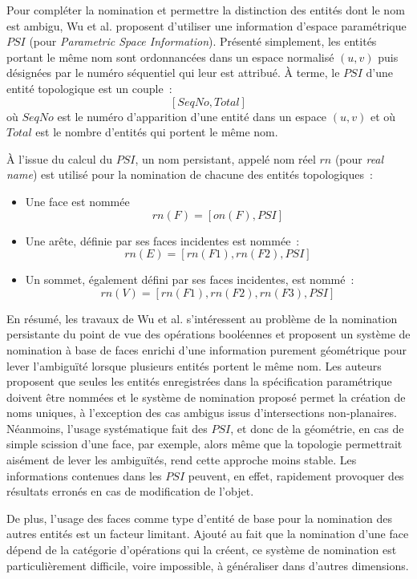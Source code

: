 Pour compléter la nomination et permettre la distinction des entités dont le
nom est ambigu, Wu et al. proposent d'utiliser une information d'espace
paramétrique \(PSI\) (pour \emph{Parametric Space Information}). %
Présenté simplement, les entités portant le même nom sont ordonnancées dans un
espace normalisé \((u,v)\) puis désignées par le numéro séquentiel qui leur est
attribué. %
À terme, le \(PSI\) d'une entité topologique est un couple~:
\[[SeqNo, Total]\] %
où \(SeqNo\) est le numéro d'apparition d'une entité dans un espace \((u,v)\) et
où \(Total\) est le nombre d'entités qui portent le même nom. %

À l'issue du calcul du \(PSI\), un nom persistant, appelé nom réel \(rn\) (pour
\emph{real name}) est utilisé pour la nomination de chacune des entités
topologiques~:
\begin{itemize}
	\item Une face est nommée %
	      \[rn(F) = [on(F), PSI]\]
	\item Une arête, définie par ses faces incidentes est nommée~:
	      \[rn(E) = [rn(F1), rn(F2), PSI]\]
	\item Un sommet, également défini par ses faces incidentes, est nommé~:
	      \[rn(V) = [rn(F1), rn(F2),rn(F3), PSI]\]
\end{itemize}

En résumé, les travaux de Wu et al. s'intéressent au problème de la nomination
persistante du point de vue des opérations booléennes et proposent un système de
nomination à base de faces enrichi d'une information purement géométrique pour
lever l'ambiguïté lorsque plusieurs entités portent le même nom. %
Les auteurs proposent que seules les entités enregistrées dans la spécification
paramétrique doivent être nommées et le système de nomination proposé permet la
création de noms uniques, à l'exception des cas ambigus issus d'intersections
non-planaires. %
Néanmoins, l'usage systématique fait des \(PSI\), et donc de la géométrie, en
cas de simple scission d'une face, par exemple, alors même que la topologie
permettrait aisément de lever les ambiguïtés, rend cette approche moins stable. %
Les informations contenues dans les \(PSI\) peuvent, en effet, rapidement
provoquer des résultats erronés en cas de modification de l'objet.

De plus, l'usage des faces comme type d'entité de base pour la nomination des
autres entités est un facteur limitant. %
Ajouté au fait que la nomination d'une face dépend de la catégorie d'opérations
qui la créent, ce système de nomination est particulièrement difficile, voire
impossible, à généraliser dans d'autres dimensions. %

